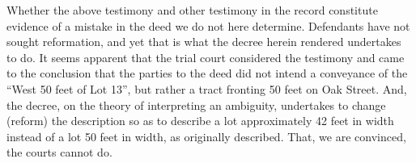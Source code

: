 Whether the above testimony and other testimony in the record constitute
evidence of a mistake in the deed we do not here determine. Defendants have not
sought reformation, and yet that is what the decree herein rendered undertakes
to do. It seems apparent that the trial court considered the testimony and came
to the conclusion that the parties to the deed did not intend a conveyance of
the ``West 50 feet of Lot 13'', but rather a tract fronting 50 feet on Oak
Street. And, the decree, on the theory of interpreting an ambiguity, undertakes
to change (reform) the description so as to describe a lot approximately 42
feet in width instead of a lot 50 feet in width, as originally described. That,
we are convinced, the courts cannot do.

